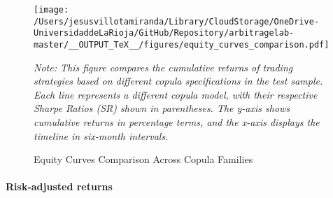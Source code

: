 \begin{figure}[H]
  \caption{Equity Curves Comparison Across Copula Families}
  \centering
  \texttt{[image: /Users/jesusvillotamiranda/Library/CloudStorage/OneDrive-UniversidaddeLaRioja/GitHub/Repository/arbitragelab-master/\_\_OUTPUT\_TeX\_\_/figures/equity\_curves\_comparison.pdf]}
  \label{fig:equity_curves_comparison}
\vspace{0.5cm}
\begin{minipage}{\textwidth}
\setlength{\parindent}{0pt}
\small\textit{Note: 
This figure compares the cumulative returns of trading strategies based on different copula specifications in the test sample. Each line represents a different copula model, with their respective Sharpe Ratios (SR) shown in parentheses. The y-axis shows cumulative returns in percentage terms, and the x-axis displays the timeline in six-month intervals.
}
\end{minipage}

\end{figure}




\paragraph{Risk-adjusted returns}

